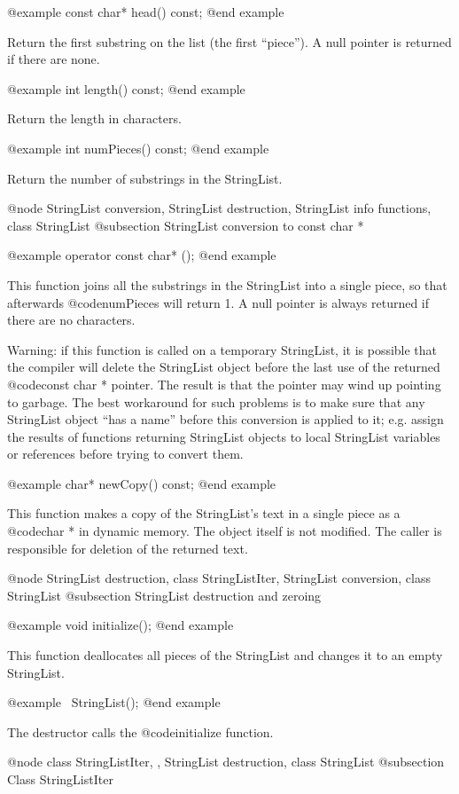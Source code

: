 @example
const char* head() const;
@end example

Return the first substring on the list (the first ``piece'').  A null
pointer is returned if there are none.

@example
int length() const;
@end example

Return the length in characters.

@example
int numPieces() const;
@end example

Return the number of substrings in the StringList.

@node StringList conversion, StringList destruction, StringList info functions, class StringList
@subsection StringList conversion to const char *

@example
operator const char* ();
@end example

This function joins all the substrings in the StringList into a
single piece, so that afterwards @code{numPieces} will return 1.
A null pointer is always returned if there are no characters.

Warning: if this function is called on a temporary StringList, it
is possible that the compiler will delete the StringList object
before the last use of the returned @code{const char *} pointer.
The result is that the pointer may wind up pointing to garbage.
The best workaround for such problems is to make sure that any
StringList object ``has a name'' before this conversion is applied
to it; e.g. assign the results of functions returning StringList
objects to local StringList variables or references before trying
to convert them.

@example
char* newCopy() const;
@end example

This function makes a copy of the StringList's text in a single piece
as a @code{char *} in dynamic memory.  The object itself is not modified.
The caller is responsible for deletion of the returned text.

@node StringList destruction, class StringListIter, StringList conversion, class StringList
@subsection StringList destruction and zeroing

@example
void initialize();
@end example

This function deallocates all pieces of the StringList and changes
it to an empty StringList.

@example
~StringList();
@end example

The destructor calls the @code{initialize} function.

@node class StringListIter,  , StringList destruction, class StringList
@subsection Class StringListIter

